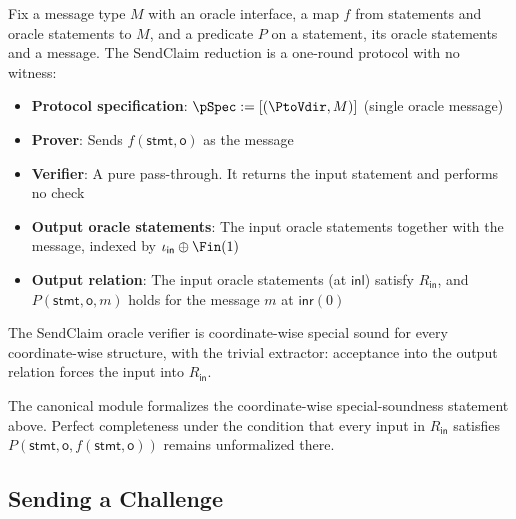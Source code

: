 \begin{definition}
    \label{def:sendclaim_oracle_reduction}
    Fix a message type $M$ with an oracle interface, a map $f$ from statements and oracle statements to $M$, and a predicate $P$ on a statement, its oracle statements and a message. The SendClaim reduction is a one-round protocol with no witness:
    \begin{itemize}
        \item \textbf{Protocol specification}: $\pSpec := [(\PtoVdir, M)]$ (single oracle message)
        \item \textbf{Prover}: Sends $f(\mathsf{stmt}, \mathsf{o})$ as the message
        \item \textbf{Verifier}: A pure pass-through. It returns the input statement and performs no check
        \item \textbf{Output oracle statements}: The input oracle statements together with the message, indexed by $\iota_{\mathsf{in}} \oplus \Fin(1)$
        \item \textbf{Output relation}: The input oracle statements (at $\mathsf{inl}$) satisfy $R_{\mathsf{in}}$, and $P(\mathsf{stmt}, \mathsf{o}, m)$ holds for the message $m$ at $\mathsf{inr}(0)$
    \end{itemize}
    \leanok
\end{definition}

\begin{theorem}
    The SendClaim oracle verifier is coordinate-wise special sound for every coordinate-wise structure, with the trivial extractor: acceptance into the output relation forces the input into $R_{\mathsf{in}}$.
    \leanok
\end{theorem}

\begin{remark}
    The canonical module formalizes the coordinate-wise special-soundness statement above.
    Perfect completeness under the condition that every input in $R_{\mathsf{in}}$ satisfies
    $P(\mathsf{stmt}, \mathsf{o}, f(\mathsf{stmt}, \mathsf{o}))$ remains unformalized there.
\end{remark}

\subsection{Sending a Challenge}

